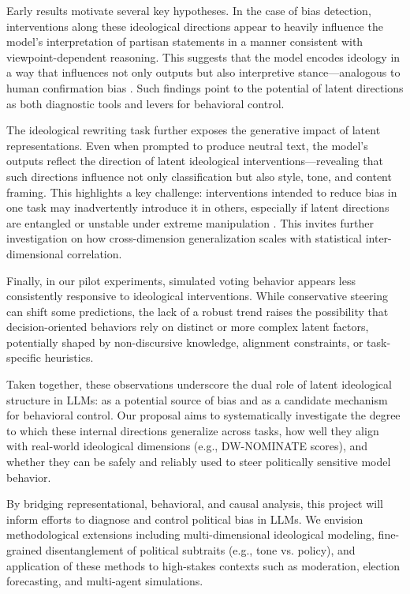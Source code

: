 \documentclass[11pt]{article}
\begin{document}
Early results motivate several key hypotheses. In the case of bias detection, interventions along these ideological directions appear to heavily influence the model’s interpretation of partisan statements in a manner consistent with viewpoint-dependent reasoning. This suggests that the model encodes ideology in a way that influences not only outputs but also interpretive stance—analogous to human confirmation bias \citep{nickersonConfirmationBiasUbiquitous1998}. Such findings point to the potential of latent directions as both diagnostic tools and levers for behavioral control.

The ideological rewriting task further exposes the generative impact of latent representations. Even when prompted to produce neutral text, the model’s outputs reflect the direction of latent ideological interventions—revealing that such directions influence not only classification but also style, tone, and content framing. This highlights a key challenge: interventions intended to reduce bias in one task may inadvertently introduce it in others, especially if latent directions are entangled or unstable under extreme manipulation \citep{kimLinearRepresentationsPolitical2025}. This invites further investigation on how cross-dimension generalization scales with statistical inter-dimensional correlation.

Finally, in our pilot experiments, simulated voting behavior appears less consistently responsive to ideological interventions. While conservative steering can shift some predictions, the lack of a robust trend raises the possibility that decision-oriented behaviors rely on distinct or more complex latent factors, potentially shaped by non-discursive knowledge, alignment constraints, or task-specific heuristics.

Taken together, these observations underscore the dual role of latent ideological structure in LLMs: as a potential source of bias and as a candidate mechanism for behavioral control. Our proposal aims to systematically investigate the degree to which these internal directions generalize across tasks, how well they align with real-world ideological dimensions (e.g., DW-NOMINATE scores), and whether they can be safely and reliably used to steer politically sensitive model behavior.

By bridging representational, behavioral, and causal analysis, this project will inform efforts to diagnose and control political bias in LLMs. We envision methodological extensions including multi-dimensional ideological modeling, fine-grained disentanglement of political subtraits (e.g., tone vs. policy), and application of these methods to high-stakes contexts such as moderation, election forecasting, and multi-agent simulations.
\end{document}
